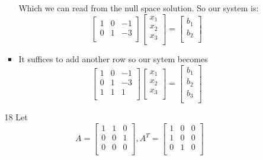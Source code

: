 \documentclass[12pt,letterpaper]{article}
\begin{document}
\begin{enumerate}[label=\S 2.\arabic*]
\begin{enumerate}
\begin{itemize}
              Which we can read from the null space solution.
              So our system is:
              \[
                \begin{bmatrix}
                  1 & 0 & -1 \\
                  0 & 1 & -3 \\
                \end{bmatrix}
                \begin{bmatrix}
                  x_1 \\
                  x_2 \\
                  x_3 \\
                \end{bmatrix}
                =
                \begin{bmatrix}
                  b_1 \\
                  b_2 \\
                \end{bmatrix}
              \]
            \item
              It suffices to add another row so our sytem becomes
              \[
                \begin{bmatrix}
                  1 & 0 & -1 \\
                  0 & 1 & -3 \\
                  1 & 1 &  1 \\
                \end{bmatrix}
                \begin{bmatrix}
                  x_1 \\
                  x_2 \\
                  x_3 \\
                \end{bmatrix}
                =
                \begin{bmatrix}
                  b_1 \\
                  b_2 \\
                  b_3 \\
                \end{bmatrix}
              \]
          \end{itemize}
        \item [18]
          Let
          \[
            A
            =
            \begin{bmatrix}
              1 & 1 & 0 \\
              0 & 0 & 1 \\
              0 & 0 & 0 \\
            \end{bmatrix}
            ,
            A^T
            =
            \begin{bmatrix}
              1 & 0 & 0 \\
              1 & 0 & 0 \\
              0 & 1 & 0 \\
            \end{bmatrix}
          \]


\end{enumerate}
\end{enumerate}
\end{document}

